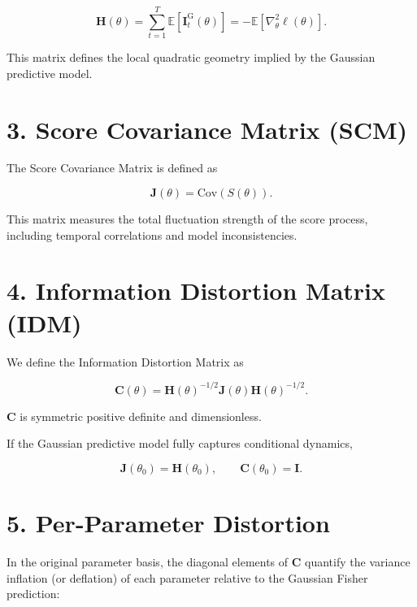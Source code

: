 \documentclass[11pt]{article}
\begin{document}
\begin{equation}
\mathbf H(\theta)
=
\sum_{t=1}^T \mathbb{E}\!\left[\mathbf I_t^{\mathrm{G}}(\theta)\right]
=
- \mathbb{E}\!\left[\nabla_\theta^2 \ell(\theta)\right].
\end{equation}

This matrix defines the local quadratic geometry implied by the Gaussian predictive model.

\section*{3. Score Covariance Matrix (SCM)}

The Score Covariance Matrix is defined as

\begin{equation}
\mathbf J(\theta)
=
\mathrm{Cov}\!\left(S(\theta)\right).
\end{equation}

This matrix measures the total fluctuation strength of the score process,
including temporal correlations and model inconsistencies.

\section*{4. Information Distortion Matrix (IDM)}

We define the Information Distortion Matrix as

\begin{equation}
\mathbf C(\theta)
=
\mathbf H(\theta)^{-1/2}
\mathbf J(\theta)
\mathbf H(\theta)^{-1/2}.
\end{equation}

$\mathbf C$ is symmetric positive definite and dimensionless.

If the Gaussian predictive model fully captures conditional dynamics,

\begin{equation}
\mathbf J(\theta_0) = \mathbf H(\theta_0),
\qquad
\mathbf C(\theta_0) = \mathbf I.
\end{equation}

\section*{5. Per-Parameter Distortion}

In the original parameter basis, the diagonal elements of $\mathbf C$ quantify
the variance inflation (or deflation) of each parameter relative to the Gaussian Fisher prediction:
\end{document}
